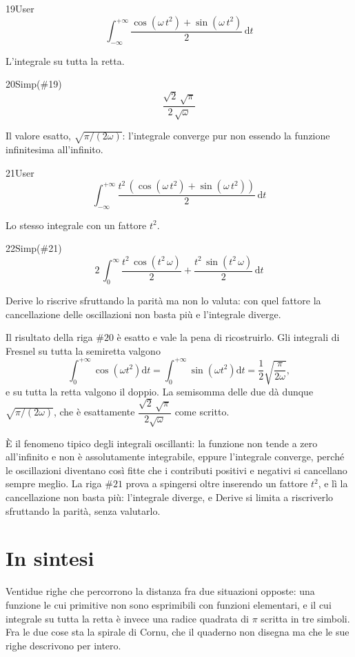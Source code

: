 \begin{espr}{19}{User}{}
\[
\int_{-\infty}^{+\infty} \frac{\cos\!\left(\omega\, t^{2}\right) + \sin\!\left(\omega\, t^{2}\right)}{2} \,\mathrm{d}t
\]
\end{espr}
L'integrale su tutta la retta.

\begin{espr}{20}{Simp(\#19)}{}
\[
\frac{\sqrt{2}\, \sqrt{\pi}}{2\, \sqrt{\omega}}
\]
\end{espr}
Il valore esatto, $\sqrt{\pi/(2\omega)}$: l'integrale converge pur non essendo la funzione infinitesima all'infinito.

\begin{espr}{21}{User}{}
\[
\int_{-\infty}^{+\infty} \frac{t^{2}\, \left(\cos\!\left(\omega\, t^{2}\right) + \sin\!\left(\omega\, t^{2}\right)\right)}{2} \,\mathrm{d}t
\]
\end{espr}
Lo stesso integrale con un fattore $t^2$.

\begin{espr}{22}{Simp(\#21)}{}
\[
2\, \int_{0}^{\infty} \frac{t^{2}\, \cos\!\left(t^{2}\, \omega\right)}{2} + \frac{t^{2}\, \sin\!\left(t^{2}\, \omega\right)}{2} \,\mathrm{d}t
\]
\end{espr}
Derive lo riscrive sfruttando la parità ma non lo valuta: con quel fattore la cancellazione delle oscillazioni non basta più e l'integrale diverge.


Il risultato della riga $\#20$ è esatto e vale la pena di ricostruirlo. Gli integrali di Fresnel su tutta la semiretta valgono
\[
  \int_0^{+\infty}\cos\!\left(\omega t^2\right)\mathrm{d}t
  =\int_0^{+\infty}\sin\!\left(\omega t^2\right)\mathrm{d}t
  =\frac{1}{2}\sqrt{\frac{\pi}{2\omega}},
\]
e su tutta la retta valgono il doppio. La semisomma delle due dà dunque $\sqrt{\pi/(2\omega)}$, che è esattamente $\dfrac{\sqrt2\,\sqrt\pi}{2\sqrt\omega}$ come scritto.

È il fenomeno tipico degli integrali oscillanti: la funzione non tende a zero all'infinito e non è assolutamente integrabile, eppure l'integrale converge, perché le oscillazioni diventano così fitte che i contributi positivi e negativi si cancellano sempre meglio. La riga $\#21$ prova a spingersi oltre inserendo un fattore $t^2$, e lì la cancellazione non basta più: l'integrale diverge, e Derive si limita a riscriverlo sfruttando la parità, senza valutarlo.

\section*{In sintesi}

Ventidue righe che percorrono la distanza fra due situazioni opposte: una funzione le cui primitive non sono esprimibili con funzioni elementari, e il cui integrale su tutta la retta è invece una radice quadrata di $\pi$ scritta in tre simboli. Fra le due cose sta la spirale di Cornu, che il quaderno non disegna ma che le sue righe descrivono per intero.

